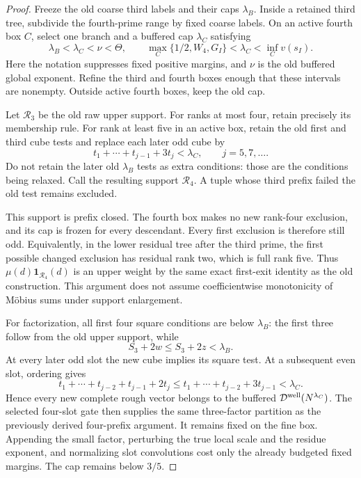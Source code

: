 \documentclass[11pt]{article}
\begin{document}
\begin{proof}
Freeze the old coarse third labels and their caps \(\lambda_B\).
Inside a retained third tree, subdivide the fourth-prime range by
fixed coarse labels. On an active fourth box \(C\), select one
branch and a buffered cap \(\lambda_C\) satisfying
\[
 \lambda_B<\lambda_C<\nu<\Theta,\qquad
 \max_C\{1/2,W_4,G_I\}<\lambda_C<\inf_C v(s_I).
\]
Here the notation suppresses fixed positive margins, and
\(\nu\) is the old buffered global exponent. Refine the third and
fourth boxes enough that these intervals are nonempty.
Outside active fourth boxes, keep the old cap.

Let \(\mathcal R_3\) be the old raw upper support.
For ranks at most four, retain precisely its membership rule.
For rank at least five in an active box, retain the old first
and third cube tests and replace each later odd cube by
\[
 t_1+\cdots+t_{j-1}+3t_j<\lambda_C,
       \qquad j=5,7,\ldots.
\]
Do not retain the later old \(\lambda_B\) tests as extra conditions:
those are the conditions being relaxed.
Call the resulting support \(\mathcal R_4\).
A tuple whose third prefix failed the old test remains excluded.

This support is prefix closed. The fourth box makes no new
rank-four exclusion, and its cap is frozen for every descendant.
Every first exclusion is therefore still odd.
Equivalently, in the lower residual tree after the third prime,
the first possible changed exclusion has residual rank two,
which is full rank five. Thus
\(\mu(d)\mathbf1_{\mathcal R_4}(d)\) is an upper weight by the
same exact first-exit identity as the old construction.
This argument does not assume coefficientwise monotonicity of
M\"obius sums under support enlargement.

For factorization, all first four square conditions are below
\(\lambda_B\): the first three follow from the old upper support,
while
\[
 S_3+2w\le S_3+2z<\lambda_B.
\]
At every later odd slot the new cube implies its square test.
At a subsequent even slot, ordering gives
\[
 t_1+\cdots+t_{j-2}+t_{j-1}+2t_j
 \le t_1+\cdots+t_{j-2}+3t_{j-1}<\lambda_C .
\]
Hence every new complete rough vector belongs to the buffered
\(\mathcal D^{\rm well}(N^{\lambda_C})\).
The selected four-slot gate then supplies the same three-factor
partition as the previously derived four-prefix argument.
It remains fixed on the fine box. Appending the small factor,
perturbing the true local scale and the residue exponent, and
normalizing slot convolutions cost only the already budgeted
fixed margins. The cap remains below \(3/5\).


\end{proof}
\end{document}
